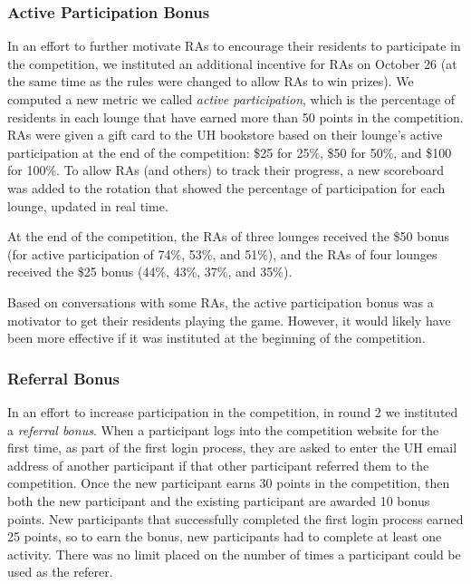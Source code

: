 \subsubsection{Active Participation Bonus}
\label{sec:active-participation-bonus}

In an effort to further motivate RAs to encourage their residents to participate in the competition, we instituted an additional incentive for RAs on October 26 (at the same time as the rules were changed to allow RAs to win prizes). We computed a new metric we called \emph{active participation}, which is the percentage of residents in each lounge that have earned more than 50 points in the competition. RAs were given a gift card to the UH \Manoa bookstore based on their lounge's active participation at the end of the competition: \$25 for 25\%, \$50 for 50\%, and \$100 for 100\%. To allow RAs (and others) to track their progress, a new scoreboard was added to the rotation that showed the percentage of participation for each lounge, updated in real time.

At the end of the competition, the RAs of three lounges received the \$50 bonus (for active participation of 74\%, 53\%, and 51\%), and the RAs of four lounges received the \$25 bonus (44\%, 43\%, 37\%, and 35\%).

Based on conversations with some RAs, the active participation bonus was a motivator to get their residents playing the game. However, it would likely have been more effective if it was instituted at the beginning of the competition.


\subsubsection{Referral Bonus}
\label{referral-bonus}

In an effort to increase participation in the competition, in round 2 we instituted a \emph{referral bonus}. When a participant logs into the competition website for the first time, as part of the first login process, they are asked to enter the UH email address of another participant if that other participant referred them to the competition. Once the new participant earns 30 points in the competition, then both the new participant and the existing participant are awarded 10 bonus points. New participants that successfully completed the first login process earned 25 points, so to earn the bonus, new participants had to complete at least one activity. There was no limit placed on the number of times a participant could be used as the referer.

